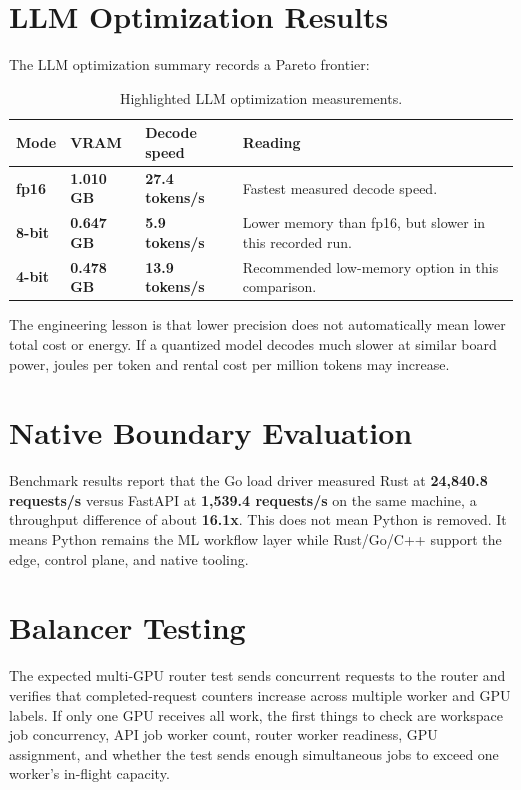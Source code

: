 \documentclass[12pt,a4paper,oneside]{report}
\newcommand{\code}[1]{\texttt{\detokenize{#1}}}
\newcommand{\metric}[2][TryOpsBlue]{\textbf{\color{#1}#2}}
\begin{document}
\section{LLM Optimization Results}

The LLM optimization summary records a Pareto frontier:

\begin{table}[H]
\centering
\caption{Highlighted LLM optimization measurements.}
\small
\begin{tabularx}{\linewidth}{>{\bfseries}p{2.2cm}p{3.1cm}p{3.1cm}X}
\toprule
\textbf{Mode} & \textbf{VRAM} & \textbf{Decode speed} & \textbf{Reading} \\
\midrule
fp16 & \metric[TryOpsBlue]{1.010 GB} & \metric[TryOpsTeal]{27.4 tokens/s} & Fastest measured decode speed. \\
8-bit & \metric[TryOpsGold]{0.647 GB} & \metric[TryOpsRed]{5.9 tokens/s} & Lower memory than fp16, but slower in this recorded run. \\
4-bit & \metric[TryOpsTeal]{0.478 GB} & \metric[TryOpsBlue]{13.9 tokens/s} & Recommended low-memory option in this comparison. \\
\bottomrule
\end{tabularx}
\end{table}

The engineering lesson is that lower precision does not automatically mean lower total cost or energy. If a quantized model decodes much slower at similar board power, joules per token and rental cost per million tokens may increase.

\section{Native Boundary Evaluation}

Benchmark results report that the Go load driver measured Rust \code{/health} at \metric[TryOpsTeal]{24,840.8 requests/s} versus FastAPI at \metric[TryOpsGold]{1,539.4 requests/s} on the same machine, a throughput difference of about \metric[TryOpsBlue]{16.1x}. This does not mean Python is removed. It means Python remains the ML workflow layer while Rust/Go/C++ support the edge, control plane, and native tooling.

\section{Balancer Testing}

The expected multi-GPU router test sends concurrent requests to the router and verifies that completed-request counters increase across multiple worker and GPU labels. If only one GPU receives all work, the first things to check are workspace job concurrency, API job worker count, router worker readiness, GPU assignment, and whether the test sends enough simultaneous jobs to exceed one worker's in-flight capacity.
\end{document}
